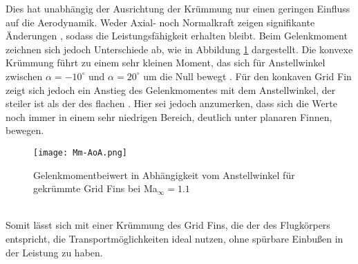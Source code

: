 Dies hat unabhängig der Ausrichtung der Krümmung nur einen geringen Einfluss auf die Aerodynamik. Weder Axial- noch Normalkraft zeigen signifikante Änderungen \cite{LambdaKonf}, sodass die Leistungsfähigkeit erhalten bleibt. Beim Gelenkmoment zeichnen sich jedoch Unterschiede ab, wie in Abbildung \ref{abb_krumm} dargestellt. Die konvexe Krümmung führt zu einem sehr kleinen Moment, das sich für Anstellwinkel zwischen $\alpha = -10^\circ$ und $\alpha=20^\circ$ um die Null bewegt \cite{LambdaKonf}. Für den konkaven Grid Fin zeigt sich jedoch ein Anstieg des Gelenkmomentes mit dem Anstellwinkel, der steiler ist als der des flachen \cite{LambdaKonf}. Hier sei jedoch anzumerken, dass sich die Werte noch immer in einem sehr niedrigen Bereich, deutlich unter planaren Finnen, bewegen.
\begin{figure}[h]
	\centering
	\texttt{[image: Mm-AoA.png]}
	\begin{flushright}
	\end{flushright}
	\caption{Gelenkmomentbeiwert in Abhängigkeit vom Anstellwinkel für gekrümmte Grid Fins bei Ma$_\infty=1.1$}
	\label{abb_krumm}
\end{figure}\\
Somit lässt sich mit einer Krümmung des Grid Fins, die der des Flugkörpers entspricht, die Transportmöglichkeiten ideal nutzen, ohne spürbare Einbußen in der Leistung zu haben.
